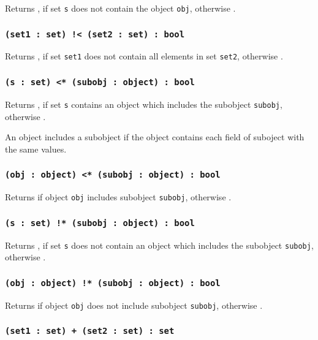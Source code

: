 Returns \true{}, if set \texttt{s} does not contain the object \texttt{obj}, otherwise \false{}.

\subsubsection{\texttt{(set1 : set) !< (set2 : set) : bool}}

Returns \true, if set \texttt{set1} does not contain all elements in set \texttt{set2}, otherwise \false.

\subsubsection{\texttt{(s : set) <* (subobj : object) : bool}}

Returns \true{}, if set \texttt{s} contains an object which includes the subobject \texttt{subobj}, otherwise \false{}.

An object includes a subobject if the object contains each field of suboject with the same values.

\subsubsection{\texttt{(obj : object) <* (subobj : object) : bool}}

Returns \true{} if object \texttt{obj} includes subobject \texttt{subobj}, otherwise \false{}.

\subsubsection{\texttt{(s : set) !* (subobj : object) : bool}}

Returns \true{}, if set \texttt{s} does not contain an object which includes the subobject \texttt{subobj}, otherwise \false{}.

\subsubsection{\texttt{(obj : object) !* (subobj : object) : bool}}

Returns \true{} if object \texttt{obj} does not include subobject \texttt{subobj}, otherwise \false{}.

\subsubsection{\texttt{(set1 : set) + (set2 : set) : set}}

